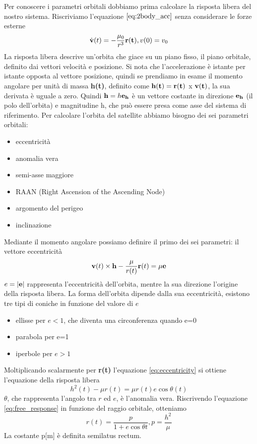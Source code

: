 Per conoscere i parametri orbitali dobbiamo prima calcolare la risposta libera
del nostro sistema. Riscriviamo l'equazione $\ref{eq:2body_acc}$ senza
considerare le forze esterne
\begin{equation}
\dot{\bf v}(t)=-\frac{\mu_0}{r^3}{\bf r(t)}, v(0)=v_0
\end{equation}
La risposta libera descrive un'orbita che giace su un piano fisso, il piano
orbitale, definito dai vettori velocità e posizione. Si nota che l'accelerazione
è istante per istante opposta al vettore posizione, quindi se prendiamo in esame
il momento angolare per unità di massa {\bf h(t)}, definito come ${\bf
h(t)}={\bf r(t)}$ x ${\bf v(t)}$, la sua derivata è uguale a zero. Quindi ${\bf
h}=h{\bf e_h}$ è un vettore costante in direzione ${\bf e_h}$ (il polo dell'orbita) e
magnitudine h, che può essere presa come asse del sistema di riferimento.
Per calcolare l'orbita del satellite abbiamo bisogno dei sei parametri orbitali:
\begin{itemize}
  \item eccentricità
  \item anomalia vera
  \item semi-asse maggiore
  \item RAAN (Right Ascension of the Ascending Node)
  \item argomento del perigeo
  \item inclinazione
\end{itemize}
Mediante il momento angolare possiamo definire il primo dei sei
parametri: il vettore eccentricità
\begin{equation}
{\bf v}(t) \times {\bf h} - \frac{\mu}{r(t)}{\bf r}(t)=\mu{\bf e}
\label{eq:eccentricity}
\end{equation}
$e=|{\bf e}|$ rappresenta  l'eccentricità dell'orbita, mentre la sua direzione
l'origine della risposta libera. La forma dell'orbita dipende dalla sua
eccentricità, esistono tre tipi di coniche in funzione del valore di $e$
\begin{itemize}
  \item ellisse per $e<1$, che diventa una circonferenza quando e=0
  \item parabola per e=1 
  \item iperbole per $e>1$
\end{itemize}
Moltiplicando scalarmente per {\bf r(t)} l'equazione \ref{eq:eccentricity} si ottiene l'equazione
della risposta libera
\begin{equation}
h^2(t)-\mu r(t)=\mu r(t)e \cos{\theta(t)}
\label{eq:free_response}
\end{equation}
$\theta$, che rappresenta l'angolo tra $r$ ed $e$, è l'anomalia vera.
Riscrivendo l'equazione \ref{eq:free_response} in funzione del raggio orbitale,
otteniamo
\begin{equation}
r(t)=\frac{p}{1+e\cos{\theta{t}}} , p=\frac{h^2}{\mu}
\end{equation}
La costante p[m] è definita semilatus rectum.


